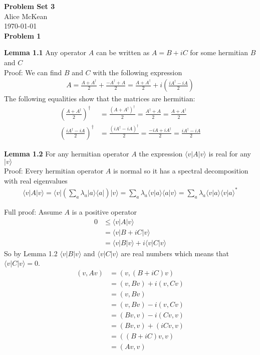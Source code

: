 \documentclass[fleqn]{article}
\newcommand{\problem}[1]{{\large\textbf{Problem #1}}}
\newcommand{\lemma}[2]{\textbf{Lemma #1} #2}
\newcommand{\bra}[1]{\ensuremath{\langle #1 |}}
\newcommand{\ket}[1]{\ensuremath{| #1 \rangle}}
\newcommand{\innerF}[2]{\ensuremath{\langle #1 | #2 \rangle}}
\newcommand{\outerF}[2]{\ket{#1} \bra{#2}}
\begin{document}
\noindent\Large\textbf{Problem Set 3} \\
\normalsize
Alice McKean \\
\today \\

\problem{1}

\lemma{1.1}{Any operator $A$ can be written as $A = B + iC$ for some hermitian
  $B$ and $C$
} \\
Proof: We can find $B$ and $C$ with the following expression
\begin{align*}
  A = \frac{A + A^{\dagger}}{2} + \frac{-A^{\dagger} + A}{2}
    = \frac{A + A^{\dagger}}{2} + i\left( \frac{iA^{\dagger} - iA}{2} \right)
\end{align*}
The following equalities show that the matrices are hermitian:
\begin{align*}
  \left( \frac{A + A^{\dagger}}{2} \right)^{\dagger}
  &= \frac{\left( A + A^{\dagger} \right)^{\dagger}}{2}
  = \frac{A^{\dagger} + A}{2}
  = \frac{A + A^{\dagger}}{2} \\
  \left( \frac{iA^{\dagger} - iA}{2} \right)^{\dagger}
  &= \frac{\left( iA^{\dagger} - iA \right)^{\dagger}}{2}
  = \frac{-iA + iA^{\dagger}}{2}
  = \frac{iA^{\dagger} - iA}{2}
\end{align*}

\lemma{1.2}{For any hermitian operator $A$ the expression
  $\bra{v}A\ket{v}$ is real for any $\ket{v}$
} \\
Proof: Every hermitian operator $A$ is normal so it has a spectral decomposition
with real eigenvalues
\begin{align*}
  \bra{v}A\ket{v} = \bra{v}\left( \sum_{a} \lambda_{a} \outerF{a}{a} \right)\ket{v}
  = \sum_{a} \lambda_{a} \innerF{v}{a} \innerF{a}{v}
  = \sum_{a} \lambda_{a} \innerF{v}{a} \innerF{v}{a}^*
\end{align*}

Full proof: Assume $A$ is a positive operator
\begin{align*}
 0 &\leq \bra{v}A\ket{v} \\
   &= \bra{v}B + iC\ket{v} \\
   &= \bra{v}B\ket{v} + i\bra{v}C\ket{v}
\end{align*}
So by Lemma 1.2 $\bra{v}B\ket{v}$ and $\bra{v}C\ket{v}$ are real numbers which
means that $\bra{v}C\ket{v} = 0$.
\begin{align*}
  ( v , Av ) &= ( v, (B + iC)v ) \\
             &= ( v, Bv ) + i( v , Cv ) \\
             &= ( v, Bv ) \\
             &= ( v, Bv ) - i( v, Cv ) \\
             &= ( Bv, v ) - i( Cv, v ) \\
             &= ( Bv, v ) + ( iCv, v ) \\
             &= ( (B + iC)v, v ) \\
             &= ( Av, v )
\end{align*}
\end{document}
